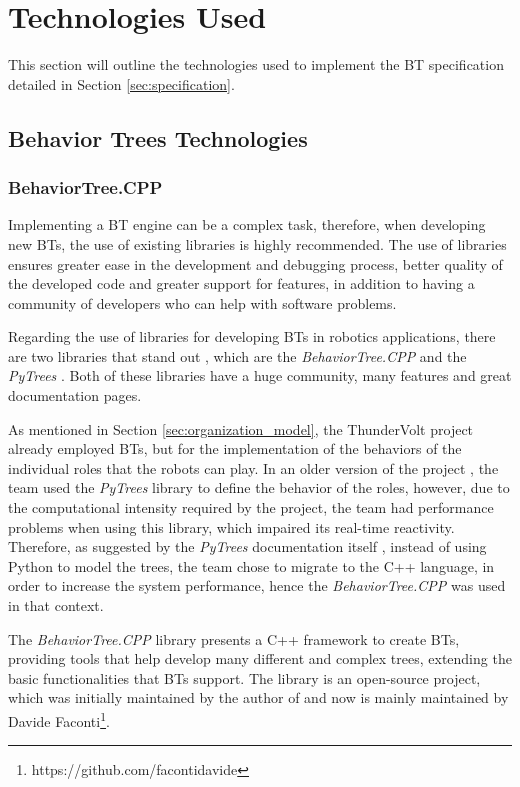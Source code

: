\section{Technologies Used}
\label{sec:technologies_used}

This section will outline the technologies used to implement the BT specification detailed in Section \ref{sec:specification}.

\subsection{Behavior Trees Technologies}

\subsubsection{BehaviorTree.CPP}

Implementing a BT engine can be a complex task, therefore, when developing new BTs, the use of existing libraries is highly recommended. The use of libraries ensures greater ease in the development and debugging process, better quality of the developed code and greater support for features, in addition to having a community of developers who can help with software problems.

Regarding the use of libraries for developing BTs in robotics applications, there are two libraries that stand out \cite{BTsAndFSMApplications}, which are the \textit{BehaviorTree.CPP} \cite{BehaviorTree.CPP} and the \textit{PyTrees} \cite{PyTrees}. Both of these libraries have a huge community, many features and great documentation pages.

As mentioned in Section \ref{sec:organization_model}, the ThunderVolt project already employed BTs, but for the implementation of the behaviors of the individual roles that the robots can play. In an older version of the project \cite{fira_thundervolt}, the team used the \textit{PyTrees} library to define the behavior of the roles, however, due to the computational intensity required by the project, the team had performance problems when using this library, which impaired its real-time reactivity. Therefore, as suggested by the \textit{PyTrees} documentation itself \cite{PyTreesDesign}, instead of using Python to model the trees, the team chose to migrate to the C++ language, in order to increase the system performance, hence the \textit{BehaviorTree.CPP} was used in that context.

The \textit{BehaviorTree.CPP} library presents a C++ framework to create BTs, providing tools that help develop many different and complex trees, extending the basic functionalities that BTs support. The library is an open-source project, which was initially maintained by the author of \cite{BTsInRobotics} and now is mainly maintained by Davide Faconti\footnote{https://github.com/facontidavide}.

